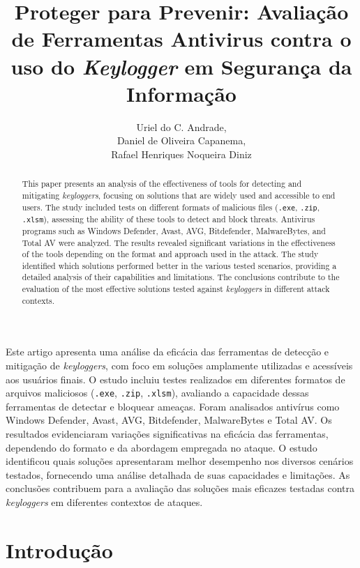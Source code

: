 \documentclass[12pt]{article}
\title{Proteger para Prevenir: Avaliação de Ferramentas Antivirus contra o uso do \textit{Keylogger} em Segurança da Informação\\ }
\author{Uriel do C. Andrade\inst{1},\\
Daniel de Oliveira Capanema\inst{1}, \\
Rafael Henriques Noqueira Diniz\inst{1}}
\begin{document}
\maketitle
\begin{abstract}
    This paper presents an analysis of the effectiveness of tools for detecting and mitigating \textit{keyloggers}, focusing on solutions 
    that are widely used and accessible to end users. The study included tests on different formats of malicious files 
    (\texttt{.exe}, \texttt{.zip}, \texttt{.xlsm}), assessing the ability of these tools to detect and block threats. Antivirus programs such as Windows 
    Defender, Avast, AVG, Bitdefender, MalwareBytes, and Total AV were analyzed.
    The results revealed significant variations in the effectiveness of the tools depending on the format and approach used in the attack. The study identified which solutions performed better in the various tested scenarios, providing a detailed analysis of their capabilities and limitations.
    The conclusions contribute to the evaluation of the most effective solutions tested against \textit{keyloggers} in different attack contexts.
\end{abstract}
    

\begin{resumo}
    Este artigo apresenta uma análise da eficácia das ferramentas de detecção e mitigação de \textit{keyloggers}, com foco em soluções 
    amplamente utilizadas e acessíveis aos usuários finais. O estudo incluiu testes realizados em diferentes formatos de arquivos 
    maliciosos (\texttt{.exe}, \texttt{.zip}, \texttt{.xlsm}), avaliando a capacidade dessas ferramentas de detectar e bloquear 
    ameaças. Foram analisados antivírus como Windows Defender, Avast, AVG, Bitdefender, MalwareBytes e Total AV.  
    Os resultados evidenciaram variações significativas na eficácia das ferramentas, dependendo do formato e da abordagem empregada no ataque. O estudo identificou quais soluções apresentaram melhor desempenho nos diversos cenários testados, fornecendo uma análise detalhada de suas capacidades e limitações.  
    As conclusões contribuem para a avaliação das soluções mais eficazes testadas contra \textit{keyloggers} em diferentes contextos de ataques.
\end{resumo}
    
\section{Introdução}
\end{document}
